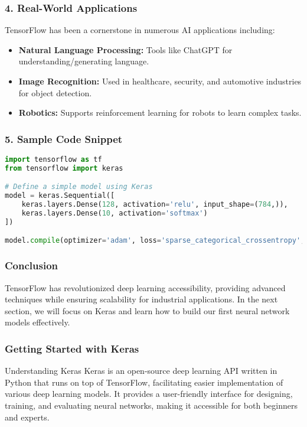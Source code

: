 \documentclass[aspectratio=169]{beamer}
\begin{document}
\begin{frame}
    \frametitle{4. Real-World Applications}
    TensorFlow has been a cornerstone in numerous AI applications including:
    \begin{itemize}
        \item \textbf{Natural Language Processing:} Tools like ChatGPT for understanding/generating language.
        \item \textbf{Image Recognition:} Used in healthcare, security, and automotive industries for object detection.
        \item \textbf{Robotics:} Supports reinforcement learning for robots to learn complex tasks.
    \end{itemize}
\end{frame}

\begin{frame}[fragile]
    \frametitle{5. Sample Code Snippet}
    \begin{lstlisting}[language=Python]
import tensorflow as tf
from tensorflow import keras

# Define a simple model using Keras
model = keras.Sequential([
    keras.layers.Dense(128, activation='relu', input_shape=(784,)), 
    keras.layers.Dense(10, activation='softmax')
])

model.compile(optimizer='adam', loss='sparse_categorical_crossentropy', metrics=['accuracy'])
    \end{lstlisting}
\end{frame}

\begin{frame}
    \frametitle{Conclusion}
    TensorFlow has revolutionized deep learning accessibility, providing advanced techniques while ensuring scalability for industrial applications. In the next section, we will focus on Keras and learn how to build our first neural network models effectively.
\end{frame}

\begin{frame}[fragile]
    \frametitle{Getting Started with Keras}
    \begin{block}{Understanding Keras}
        Keras is an open-source deep learning API written in Python that runs on top of TensorFlow, facilitating easier implementation of various deep learning models. It provides a user-friendly interface for designing, training, and evaluating neural networks, making it accessible for both beginners and experts.
    \end{block}
\end{frame}
\end{document}
